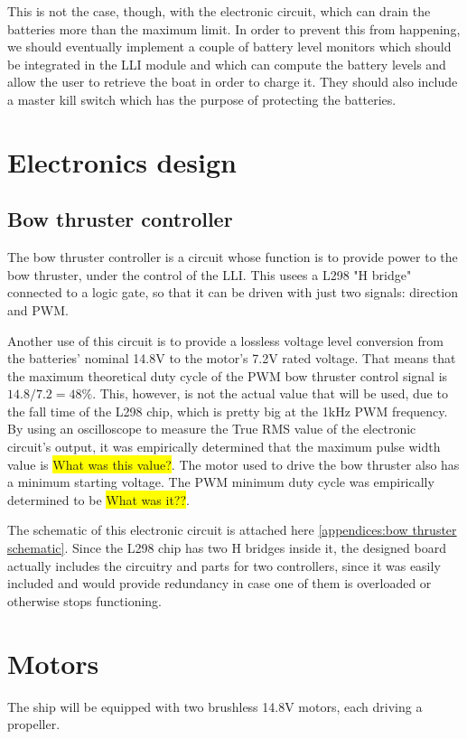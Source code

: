 	This is not the case, though, with the electronic circuit, which can drain the batteries more than the maximum limit. In order to prevent this from happening, we should eventually implement a couple of battery level monitors which should be integrated in the \ac{LLI} module and which can compute the battery levels and allow the user to retrieve the boat in order to charge it. They should also include a master kill switch which has the purpose of protecting the batteries.

\section{Electronics design}

	\subsection{Bow thruster controller}
	\label{subsec:bow thruster controller}
	
	The bow thruster controller is a circuit whose function is to provide power to the bow thruster, under the control of the \ac{LLI}. This usees a L298 "H bridge" connected to a logic gate, so that it can be driven with just two signals: direction and \ac{PWM}.
	
	Another use of this circuit is to provide a lossless voltage level conversion from the batteries' nominal 14.8V to the motor's 7.2V rated voltage. That means that the maximum theoretical duty cycle of the PWM bow thruster control signal is $ 14.8 / 7.2 = 48 \% $. This, however, is not the actual value that will be used, due to the fall time of the L298 chip, which is pretty big at the 1kHz PWM frequency. By using an oscilloscope to measure the True RMS value of the electronic circuit's output, it was empirically determined that the maximum pulse width value is \colorbox{yellow}{What was this value?}. 
	The motor used to drive the bow thruster also has a minimum starting voltage. The PWM minimum duty cycle was empirically determined to be \colorbox{yellow}{What was it??}.
	
	The schematic of this electronic circuit is attached here \ref{appendices:bow thruster schematic}. Since the L298 chip has two H bridges inside it, the designed board actually includes the circuitry and parts for two controllers, since it was easily included and would provide redundancy in case one of them is overloaded or otherwise stops functioning.
	
	\section{Motors}
	
	The ship will be equipped with two brushless 14.8V motors, each driving a propeller. 